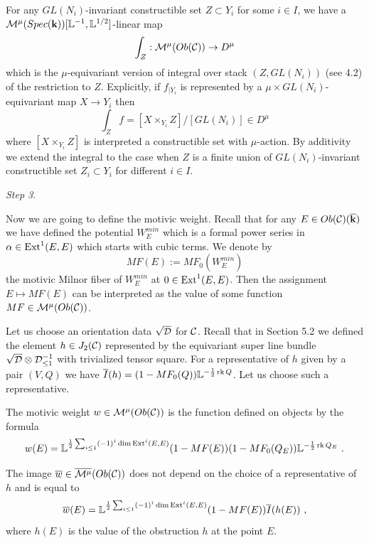 \documentclass[12pt]{article}
\begin{document}
For any $GL(N_i)$-invariant constructible set $Z\subset Y_i$ for some $i\in I$, we have a ${\cal M}^\mu(Spec({\bf k}))[{\mathbb L}^{-1}, {\mathbb L}^{1/2}]$-linear map
$$\int_Z: {\cal M}^{\mu}(Ob({\mathcal C}))\to {D}^{\mu} $$
which is the $\mu$-equivariant version of integral over stack $(Z,GL(N_i))$ (see 4.2) of the restriction  to $Z$.
 Explicitly, if $f_{|Y_i}$ is represented by a $\mu\times GL(N_i)$-equivariant map $X\to Y_i$ then
$$\int_Z f=[X\times_{Y_i} Z]/[GL(N_i)] \in D^\mu $$
where $[X\times_{Y_i} Z]$ is interpreted a constructible set with $\mu$-action.
By additivity we extend the integral to the case when $Z$ is a finite union of $GL(N_i)$-invariant constructible set $Z_i\subset Y_i$ for different $i\in I$.




{\it Step 3}.

Now we are going to define the motivic weight. 
Recall that for any $E\in Ob({\mathcal C})({\overline{\bf k}})$ we have defined the potential $W_E^{min}$ which is a formal power series in $\alpha\in \operatorname{Ext}^1(E,E)$ which starts with cubic terms. 
We denote by 
$$MF(E):=MF_0(W_E^{min})$$ the motivic Milnor fiber of $W_E^{min}$ at $0\in \operatorname{Ext}^1(E,E)$. Then the assignment $E\mapsto MF(E)$ can be interpreted as the value of some function $MF\in {\cal M}^{\mu}(Ob({\mathcal C}))$.

Let us choose an orientation data $\sqrt{\cal D}$ for ${\mathcal C}$. Recall that in Section 5.2 we defined the element $h\in J_2({\mathcal C})$ represented by the equivariant super line bundle $\sqrt{\cal D}\otimes {\cal D}_{\le 1}^{-1}$ with trivialized tensor square. For a representative of $h$ given by a pair $(V,Q)$ we have $\overline{I}(h)=(1-MF_0(Q)){\mathbb L}^{-{1\over{2}}\operatorname{rk} Q}$. Let us choose such a representative.









\begin{defn} The motivic weight $w\in {\cal M}^{\mu}(Ob({\mathcal C}))$ is the function defined on objects by the formula
$$w(E)={\mathbb L}^{{1\over{2}}\sum_{i\le 1}(-1)^i \dim \operatorname{Ext}^i(E,E)}(1-MF(E))(1-MF_0(Q_E)){\mathbb L}^{{-{1\over{2}}\operatorname{rk}Q_E}}\,\,.$$

\end{defn}



The image $\overline{w}\in \overline{{\cal M}^{\mu}}(Ob({\mathcal C}))$ does not depend on the choice of a representative of $h$ and is equal to
$$\overline{w}(E)={\mathbb L}^{{1\over{2}}\sum_{i\le 1}(-1)^i \dim \operatorname{Ext}^i(E,E)}(1-MF(E))\overline{I}(h(E))\,\,,$$
where $h(E)$ is the value of the obstruction $h$ at the point $E$.
\end{document}
